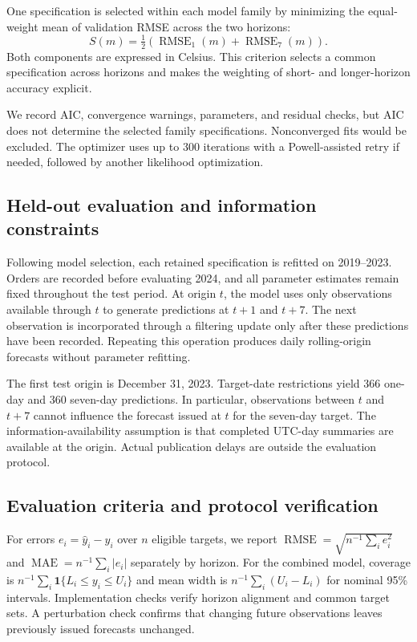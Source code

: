 \documentclass{article}
\begin{document}
One specification is selected within each model family by minimizing the
equal-weight mean of validation RMSE across the two horizons:
\begin{equation}
S(m)=\tfrac12\left(\operatorname{RMSE}_{1}(m)+
\operatorname{RMSE}_{7}(m)\right).
\end{equation}
Both components are expressed in Celsius. This criterion selects a common
specification across horizons and makes the weighting of short- and
longer-horizon accuracy explicit.

We record AIC, convergence warnings, parameters, and residual checks, but AIC
does not determine the selected family specifications. Nonconverged fits would
be excluded. The optimizer uses up to 300 iterations with a Powell-assisted
retry if needed, followed by another likelihood optimization.

\subsection{Held-out evaluation and information constraints}
Following model selection, each retained specification is refitted on
2019--2023. Orders are recorded before evaluating 2024, and all parameter
estimates remain fixed throughout the test period. At origin $t$, the model
uses only observations available through $t$ to generate predictions at
$t+1$ and $t+7$. The next observation is incorporated through a filtering
update only after these predictions have been recorded. Repeating this
operation produces daily rolling-origin forecasts without parameter refitting.

The first test origin is December 31, 2023. Target-date restrictions yield
366 one-day and 360 seven-day predictions. In particular, observations between
$t$ and $t+7$ cannot influence the forecast issued at $t$ for the seven-day
target. The information-availability assumption is that completed UTC-day
summaries are available at the origin. Actual publication delays are outside
the evaluation protocol.

\subsection{Evaluation criteria and protocol verification}
For errors $e_i=\widehat y_i-y_i$ over $n$ eligible targets, we report
$\operatorname{RMSE}=\sqrt{n^{-1}\sum_i e_i^2}$ and
$\operatorname{MAE}=n^{-1}\sum_i|e_i|$ separately by horizon.
For the combined model, coverage is $n^{-1}\sum_i\mathbf{1}\{L_i\leq y_i\leq U_i\}$
and mean width is $n^{-1}\sum_i(U_i-L_i)$ for nominal 95\% intervals.
Implementation checks verify horizon alignment and common target sets.
A perturbation check confirms that changing future observations leaves
previously issued forecasts unchanged.
\end{document}
